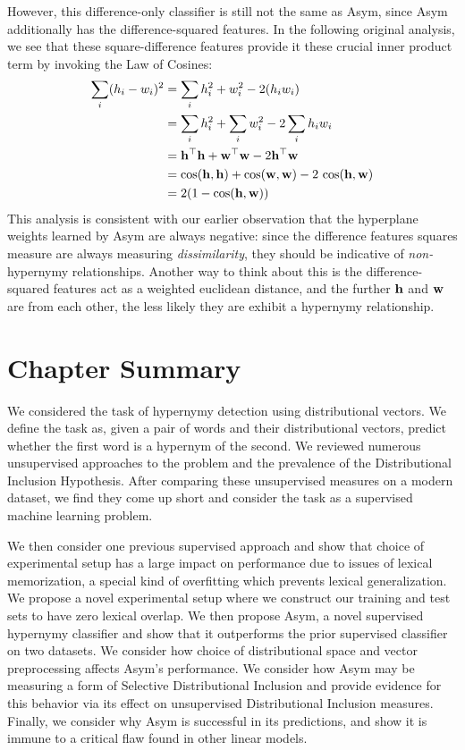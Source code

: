 However, this difference-only classifier  is still not the same as Asym, since
Asym additionally has the difference-squared features.  In the following original
analysis, we see that these square-difference features provide it these
crucial inner product term by invoking the Law of Cosines:
\begin{align*}
  \sum_i (h_i - w_i)^2 & = \sum_i h_i^2 + w_i^2 - 2({h}_i{w}_i)\\
  & = \sum_i h_i^2 + \sum_i w_i^2 - 2 \sum_i {h}_i{w}_i\\
  & = {\mathbf{h}}^{\top}{\mathbf{h}} + {\mathbf{w}}^{\top}{\mathbf{w}} - 2{\mathbf{h}}^{\top}{\mathbf{w}}\\
  & = \mbox{cos}({\mathbf{h}}, {\mathbf{h}}) + \mbox{cos}({\mathbf{w}}, {\mathbf{w}}) - 2~\mbox{cos}({\mathbf{h}}, {\mathbf{w}})\\
  & = 2(1 - \mbox{cos}({\mathbf{h}}, {\mathbf{w}}))
\end{align*}
This analysis is consistent with our earlier observation that the hyperplane
weights learned by Asym are always negative: since the difference features
squares measure are always measuring {\em dissimilarity}, they should be
indicative of {\em non-}hypernymy relationships. Another way to think about
this is the difference-squared features act as a weighted euclidean distance,
and the further ${\mathbf{h}}$ and ${\mathbf{w}}$ are from each other, the less likely they
are exhibit a hypernymy relationship.

\section{Chapter Summary}

We considered the task of hypernymy detection using distributional vectors.
We define the task as, given a pair of words and their distributional vectors,
predict whether the first word is a hypernym of the second. We reviewed
numerous unsupervised approaches to the problem and the prevalence of the
Distributional Inclusion Hypothesis. After comparing these unsupervised
measures on a modern dataset, we find they come up short and consider the task
as a supervised machine learning problem.

We then consider one previous supervised approach and show that choice of
experimental setup has a large impact on performance due to issues of
lexical memorization, a special kind of overfitting which prevents lexical
generalization. We propose a novel experimental setup where we construct our
training and test sets to have zero lexical overlap. We then propose Asym, a
novel supervised hypernymy classifier and show that it outperforms the prior
supervised classifier on two datasets. We consider how choice of distributional
space and vector preprocessing affects Asym's performance. We consider how Asym
may be measuring a form of Selective Distributional Inclusion and provide
evidence for this behavior via its effect on unsupervised Distributional
Inclusion measures. Finally, we consider why Asym is successful in its
predictions, and show it is immune to a critical flaw found in other linear
models.

